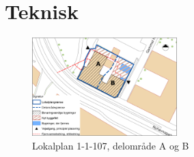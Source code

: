 \chapter{Teknisk}

\begin{figure}[htbp]
	\centering
	\includegraphics[width=0.5\textwidth]{billeder/signatur.png}
	\caption{Lokalplan 1-1-107, delområde A og B}
	\label{fig:hej}
\end{figure}